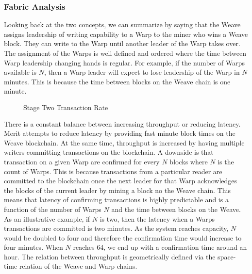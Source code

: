\documentclass{article}
\begin{document}
\subsubsection{Fabric Analysis}

Looking back at the two concepts, we can summarize by saying that the Weave
assigns leadership of writing capability to a Warp to the miner who wins a Weave block.
They can write to the Warp until another leader of the Warp takes over.  The assignment
of the Warps is well defined and ordered where the time between Warp leadership
changing hands is regular.  For example, if the number of Warps available is $N$, then
a Warp leader will expect to lose leadership of the Warp in $N$ minutes.  This
is because the time between blocks on the Weave chain is one minute. 

\begin{figure}[H]
    \caption{Stage Two Transaction Rate}
\end{figure}

There is a constant balance between increasing throughput or reducing latency.
Merit attempts to reduce latency by providing fast minute block times on the Weave
blockchain.  At the same time, throughput is increased by having multiple writers
committing transactions on the blockchain.  A downside is that transaction on a given
Warp are confirmed for every $N$ blocks where $N$ is the count of Warps.  This is
because transactions from a particular reader are committed to the blockchain once
the next leader for that Warp acknowledges the blocks of the current leader by
mining a block no the Weave chain.  This means that latency of confirming transactions
is highly predictable and is a function of the number of Warps $N$ and the time
between blocks on the Weave.  As an illustrative example, if $N$ is two, then the
latency when a Warps transactions are committed is two minutes.  As the system reaches
capacity, $N$ would be doubled to four and therefore the confirmation time would
increase to four minutes.  When $N$ reaches 64, we end up with a confirmation time
around an hour.  The relation between throughput is geometrically defined via the
space-time relation of the Weave and Warp chains.
\end{document}
